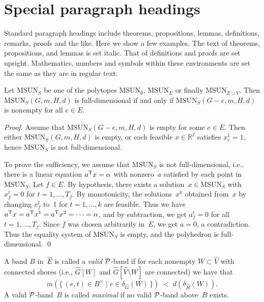 \documentclass[twocolumn]{svjour3}          %
\newcommand{\MSUN}{{\mathrm{MSUN}}}
\newcommand{\R}{{\mathbb{R}}}
\newcommand{\del}{\setminus}
\begin{document}
\section{Special paragraph headings}

Standard paragraph headings include theorems, propositions,
lemmas, definitions, remarks, proofs and the like. Here we show a
few examples. The text of theorems, propositions, and lemmas is
set italic. That of definitions and proofs are set upright.
Mathematics, numbers and symbols within these environments are set
the same as they are in regular text.

\begin{proposition}
\label{pr:dimension} Let $\MSUN_S$ be one of the polytopes
$\MSUN_\emptyset$, $\MSUN_E$ or finally $\MSUN_{E\cup V}$. Then
$\MSUN_S(G,m,H,d)$ is full-dimensional if and only if
$\MSUN_S(G-e,m,H,d)$ is non\-empty for all $e\in E$.
\end{proposition}
%
\begin{proof}
Assume that $\MSUN_S(G-e,m,H,d)$ is empty for some $e\in E$.
Then either
$\MSUN_S(G,m,H,d)$ is empty,
or each feasible $x \in \R^I$ satisfies $x^1_e = 1$,
hence $\MSUN_S$ is not full-dimensional.

To prove the sufficiency, we assume that $\MSUN_S$ is not
full-dimensional, i.e., there is a linear equation $a^{\rm T}x = \alpha$
with nonzero~$a$ satisfied by each point in $\MSUN_S$.
Let $f \in E$. By hypothesis, there exists a solution~$x\in \MSUN_S$
with $x^t_f = 0$ for $t = 1, \ldots, T_{f}$.
By monotonicity, the solutions~$x^k$
obtained from~$x$ by changing $x^t_{f}$ to~1 for $t=1,\ldots,k$
are feasible. Thus we have $a^{\rm T}x = a^{\rm T}x^1 = a^{\rm T}x^2 = \cdots = \alpha$,
and by subtraction, we get $a^t_f = 0$ for all $t=1,\ldots,T_f$.
Since $f$ was chosen arbitrarily in~$E$,
we get $a = 0$, a contradiction. Thus the
equality system of $\MSUN_S$ is empty, and the polyhedron is
full-dimensional.
\qed \end{proof}

\begin{definition}
A band $B$ in~$\hat{E}$ is called a {\it valid} $\cal P${-band} if
for each nonempty $W\subset \hat{V}$ with connected shores (i.e.,
$\hat{G}[W]$ and $\hat{G}[\hat{V} \del W]$ are connected) we have
that
%
\begin{equation}
\label{eq:valid_band_def}
     m( \{\, (e,t) \in B^< \mid e \in \delta_{\hat{G}} (W)\,\} )
\;<\; d(\delta_{\hat{H}} (W) ).
\end{equation}
%
A valid $\cal P$-band~$B$ is called {\it maximal} if no valid
$\cal P$-band above~$B$ exists.
\end{definition}
\end{document}
